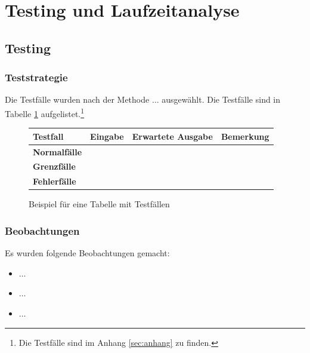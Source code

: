 \section{Testing und Laufzeitanalyse}
\label{sec:testing_und_laufzeitanalyse}

\subsection{Testing}
\label{ssec:testing}

\subsubsection{Teststrategie}
\label{sssec:teststrategie}

Die Testfälle wurden nach der Methode $\ldots$ ausgewählt.
Die Testfälle sind in Tabelle \ref{tab:example_testcases} aufgelistet.\footnote{Die Testfälle sind im Anhang \ref{sec:anhang} zu finden.}

\begin{figure}[H]
    \centering
    \begin{tabular}{|l|l|l|l|}
        \hline
        \textbf{Testfall}    & \textbf{Eingabe} & \textbf{Erwartete Ausgabe} & \textbf{Bemerkung} \\
        \hline
        \hline
        \textbf{Normalfälle} &                  &                            &                    \\
        \hline
        \hline
        \textbf{Grenzfälle}  &                  &                            &                    \\
        \hline
        \hline
        \textbf{Fehlerfälle} &                  &                            &                    \\
        \hline
    \end{tabular}
    \caption{Beispiel für eine Tabelle mit Testfällen}
    \label{tab:example_testcases}
\end{figure}

\subsubsection{Beobachtungen}
\label{sssec:beobachtungen}

Es wurden folgende Beobachtungen gemacht:
\begin{itemize}
    \item $\ldots$
    \item $\ldots$
    \item $\ldots$
\end{itemize}

